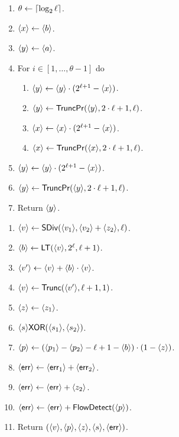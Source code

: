 \begin{enumerate}
\item $\theta \leftarrow {\lceil \log_{2} \ell \rceil}$. 
\item $\langle x \rangle \leftarrow \langle b \rangle$.
\item $\langle y \rangle \leftarrow \langle a \rangle$.
\item For $i \in [1,\ldots,\theta-1]$ do
\begin{enumerate}
  \item $\langle y \rangle \leftarrow \langle y \rangle \cdot (2^{\ell+1}-\langle x \rangle)$.
  \item $\langle y \rangle \leftarrow \mathsf{TruncPr}(\langle y \rangle,2\cdot \ell+1,\ell)$.
  \item $\langle x \rangle \leftarrow \langle x \rangle \cdot (2^{\ell+1}-\langle x \rangle)$.
  \item $\langle x \rangle \leftarrow \mathsf{TruncPr}(\langle x \rangle,2\cdot \ell+1,\ell)$.
\end{enumerate}
\item $\langle y \rangle \leftarrow \langle y \rangle \cdot (2^{\ell+1}-\langle x \rangle)$.
\item $\langle y \rangle \leftarrow \mathsf{TruncPr}(\langle y \rangle,2\cdot \ell+1,\ell)$.
\item Return $\langle y \rangle$.
\end{enumerate}

\begin{enumerate}
\item $\langle v \rangle \leftarrow \mathsf{SDiv}(\langle v_1 \rangle,\langle v_2 \rangle+\langle z_2 \rangle,\ell)$.
\item $\langle b \rangle \leftarrow \mathsf{LT}(\langle v \rangle,2^\ell,\ell+1)$.
\item $\langle v' \rangle \leftarrow \langle v \rangle+\langle b \rangle \cdot \langle v \rangle$.
\item $\langle v \rangle \leftarrow \mathsf{Trunc}(\langle v' \rangle, \ell+1, 1)$.
\item $\langle z \rangle \leftarrow \langle z_1 \rangle$.
\item $\langle s \rangle \mathsf{XOR}(\langle s_1 \rangle,\langle s_2 \rangle)$.
\item $\langle p \rangle \leftarrow (\langle p_1 \rangle-\langle p_2 \rangle-\ell+1-\langle b \rangle) \cdot (1-\langle z \rangle)$.
\item $\langle \mathsf{err} \rangle \leftarrow \langle \mathsf{err}_1 \rangle + \langle \mathsf{err}_2 \rangle$.
\item $\langle \mathsf{err} \rangle \leftarrow \langle \mathsf{err} \rangle + \langle z_2 \rangle$.
\item $\langle \mathsf{err} \rangle \leftarrow \langle \mathsf{err} \rangle + \mathsf{FlowDetect}(\langle p \rangle)$.
\item Return $(\langle v \rangle,\langle p \rangle,\langle z \rangle,\langle s \rangle,\langle \mathsf{err} \rangle)$.
\end{enumerate}


